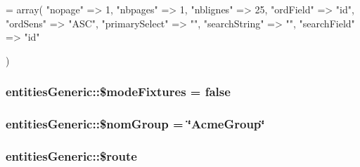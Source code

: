 \begin{DoxyCode}
= array(            
        \textcolor{stringliteral}{"nopage"}        => 1,               
        \textcolor{stringliteral}{"nbpages"}       => 1,               
        \textcolor{stringliteral}{"nblignes"}      => 25,              
        \textcolor{stringliteral}{"ordField"}      => \textcolor{stringliteral}{"id"},            
        \textcolor{stringliteral}{"ordSens"}       => \textcolor{stringliteral}{"ASC"},           
        \textcolor{stringliteral}{"primarySelect"} => \textcolor{stringliteral}{""},              
        \textcolor{stringliteral}{"searchString"}  => \textcolor{stringliteral}{""},              
        \textcolor{stringliteral}{"searchField"}   => \textcolor{stringliteral}{"id"}             
                                            
                                            
        )
\end{DoxyCode}
\hypertarget{classentities_generic_ab4ef0b663e7197e65a412c9ab23c0147}{
\subsubsection[{\$mode\+Fixtures}]{\setlength{\rightskip}{0pt plus 5cm}entities\+Generic\+::\$mode\+Fixtures = {\bf false}\hspace{0.3cm}{\ttfamily [protected]}}}\label{classentities_generic_ab4ef0b663e7197e65a412c9ab23c0147}
\hypertarget{classentities_generic_a81e73ceb0dd28185fe03580aeb951f0e}{
\subsubsection[{\$nom\+Group}]{\setlength{\rightskip}{0pt plus 5cm}entities\+Generic\+::\$nom\+Group = \char`\"{}Acme\+Group\char`\"{}\hspace{0.3cm}{\ttfamily [protected]}}}\label{classentities_generic_a81e73ceb0dd28185fe03580aeb951f0e}
\hypertarget{classentities_generic_a128e5757daf51b5ddd00f00bfc0b51f7}{
\subsubsection[{\$route}]{\setlength{\rightskip}{0pt plus 5cm}entities\+Generic\+::\$route\hspace{0.3cm}{\ttfamily [protected]}}}\label{classentities_generic_a128e5757daf51b5ddd00f00bfc0b51f7}
